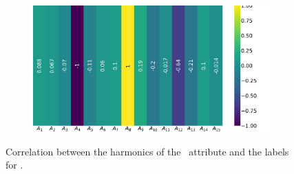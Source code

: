 \begin{figure}[!ht]
\begin{subfigure}{0.49\linewidth}
	\end{subfigure}
	\begin{subfigure}{0.49\linewidth}
		\includegraphics[width=\linewidth]{img/qlp_corr/An_coil3.png}
	\end{subfigure}
	\caption{Correlation between the harmonics of the \an\ attribute and the labels for \qlp.}
	\label{fig:an-lcorr-qlp}
\end{figure}

